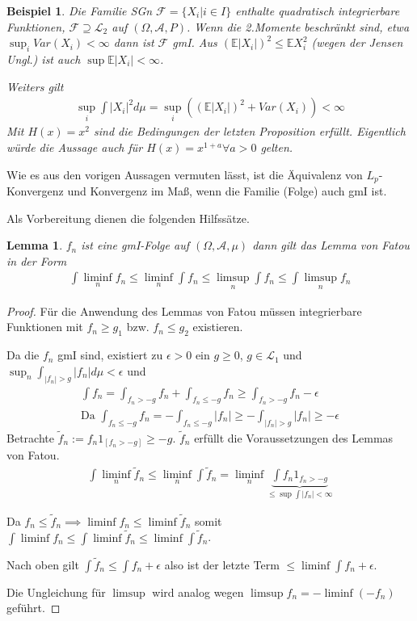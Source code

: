 \documentclass[]{article}
\newtheorem{lemma}{Lemma}
\newtheorem*{example}{Beispiel}
\begin{document}
\begin{example}
	Die Familie SGn $\mathcal{F}=\{X_i|i\in I\}$ enthalte quadratisch integrierbare Funktionen, $\mathcal{F}\supseteq \mathcal{L}_2$ auf $(\Omega, \mathcal{A}, P)$. Wenn die 2.Momente beschränkt sind, etwa $\sup_i Var(X_i) < \infty$ dann ist $\mathcal{F}$ gmI. Aus $(\mathbb{E}|X_i|)^2 \leq \mathbb{E}X_i^2$ (wegen der Jensen Ungl.) ist auch $\sup \mathbb{E}|X_i| < \infty$.
	
	Weiters gilt
	\begin{align*}
		\sup_i \int |X_i|^2 d\mu = \sup_i \left((\mathbb{E}|X_i|)^2 + Var(X_i)\right) < \infty
	\end{align*}
	Mit $H(x)=x^2$ sind die Bedingungen der letzten Proposition erfüllt. Eigentlich würde die Aussage auch für $H(x)=x^{1+a} \forall a > 0$ gelten.
\end{example}

Wie es aus den vorigen Aussagen vermuten lässt, ist die Äquivalenz von $L_p$-Konvergenz und Konvergenz im Maß, wenn die Familie (Folge) auch gmI ist.

Als Vorbereitung dienen die folgenden Hilfssätze.

\begin{lemma}
	$f_n$ ist eine gmI-Folge auf $(\Omega, \mathcal{A}, \mu)$ dann gilt das Lemma von Fatou in der Form
	\begin{align*}
		\int \liminf_n f_n \leq \liminf_n \int f_n \leq \limsup_n \int f_n \leq \int \limsup_n f_n
	\end{align*}
\end{lemma}

\begin{proof}
	Für die Anwendung des Lemmas von Fatou müssen integrierbare Funktionen mit $f_n \geq g_1$ bzw. $f_n \leq g_2$ existieren.
	
	Da die $f_n$ gmI sind, existiert zu $\epsilon > 0$ ein $g \geq 0$, $g \in \mathcal{L}_1$ und $\sup_n \int_{|f_n|>g} |f_n| d\mu < \epsilon$ und
	\begin{align*}
		\int f_n = \int_{f_n > -g} f_n + \int_{f_n\leq -g}f_n \geq \int_{f_n>-g}f_n - \epsilon\\
		\text{Da } \int_{f_n\leq-g} f_n = -\int_{f_n \leq -g} |f_n| \geq - \int_{|f_n|>g} |f_n| \geq - \epsilon
	\end{align*}
	Betrachte $\tilde{f}_n:=f_n1_{[f_n>-g]}\geq -g$. $\tilde{f}_n$ erfüllt die Voraussetzungen des Lemmas von Fatou.
	\begin{align*}
		\int \liminf_n \tilde{f}_n \leq \liminf_n \int \tilde{f}_n = \liminf_n \underbrace{\int f_n 1_{f_n>-g}}_{\leq \sup \int |f_n| < \infty}
	\end{align*}

	Da $f_n \leq \tilde{f}_n \implies \liminf f_n \leq \liminf \tilde{f}_n$ somit $\int \liminf f_n \leq \int \liminf \tilde{f}_n \leq \liminf \int \tilde{f}_n$.
	
	Nach oben gilt $\int \tilde{f}_n \leq \int f_n + \epsilon$ also ist der letzte Term $\leq \liminf \int f_n + \epsilon$.
	
	Die Ungleichung für $\limsup$ wird analog wegen $\limsup f_n = - \liminf(-f_n)$ geführt.
\end{proof}
\end{document}
